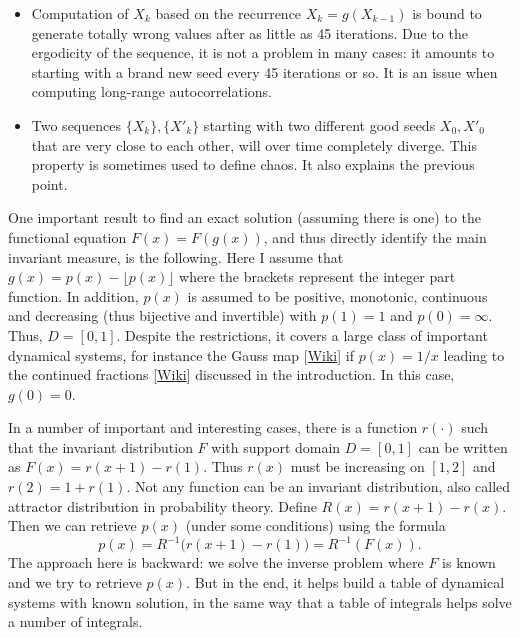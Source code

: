 \documentclass[oneside,10pt]{book}
\begin{document}
\begin{itemize}
\item Computation of $X_k$ based on the recurrence $X_k=g(X_{k-1})$  is bound to generate totally wrong values after as little as 45 iterations. Due to the \textcolor{index}{ergodicity} of the sequence, it is not a problem in many cases: it amounts to starting with a brand new seed every 45 iterations or so. It is an issue when computing long-range autocorrelations.
\item Two sequences $\{X_k\}, \{X'_k\}$ starting with two different good seeds $X_0, X'_0$ that are very close to each other, will over time completely diverge. This property is sometimes used to define chaos. It also explains the previous point.
\end{itemize} \vspace{1ex}

\noindent One important result to find an exact solution (assuming there is one) to the functional equation $F(x) = F(g(x))$, and thus directly identify the main invariant measure, is the following. Here I assume that $g(x) = p(x) - \lfloor p(x)\rfloor$ where the brackets represent the integer part function. In addition, $p(x)$ is assumed to be positive, monotonic, continuous and decreasing (thus bijective and invertible) with $p(1)=1$ and $p(0)=\infty$. Thus, $D = [0, 1]$. Despite the restrictions, it covers a large class of important dynamical systems, for instance
 the \textcolor{index}{Gauss map} [\href{https://en.wikipedia.org/wiki/Gauss\%E2\%80\%93Kuzmin\%E2\%80\%93Wirsing_operator}{Wiki}] if $p(x) = 1/x$  leading to the \textcolor{index}{continued fractions} [\href{https://en.wikipedia.org/wiki/Continued_fraction}{Wiki}] discussed in the introduction. In this case, $g(0)=0$.

In a number of important and interesting cases, there is a function $r(\cdot)$ such that the \textcolor{index}{invariant distribution} $F$ with support domain
 $D=[0, 1]$ can be written as $F(x)=r(x+1)-r(1)$.  Thus $r(x)$ must be increasing on $[1,2]$ and $r(2)=1+r(1)$. Not any function can be an invariant distribution, also called 
\textcolor{index}{attractor distribution} in probability theory. Define $R(x)=r(x+1)-r(x)$. Then we can retrieve $p(x)$ (under some conditions) using the formula
\begin{equation}
p(x)=R^{-1}\Big(r(x+1)-r(1)\Big)=R^{-1}(F(x)). \label{ch2eq1}
\end{equation}
The approach here is backward: we solve the inverse problem where $F$ is known and we try to retrieve $p(x)$. But in the end, it helps build a table of dynamical systems with known solution, in the same way that a table of integrals helps solve a number of integrals. 
\end{document}
